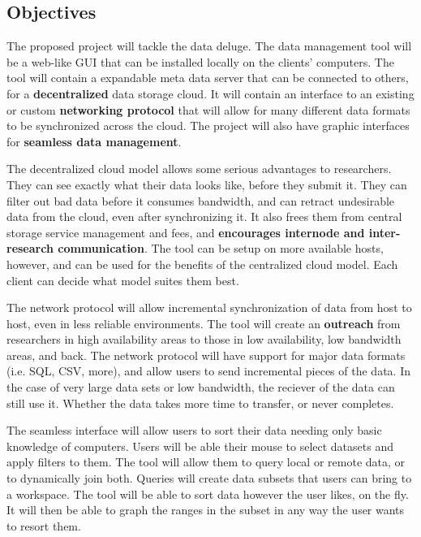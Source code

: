 \subsection{Objectives}
The proposed project will tackle the data deluge. The data management tool
will be a web-like GUI that can be installed locally on the clients' computers.
The tool will contain a expandable meta data server 
that can be connected to others, for a \textbf{decentralized} data storage
cloud. It will contain an interface to an existing or custom 
\textbf{networking protocol} that will allow for many different data formats
to be synchronized across the cloud. The project will also have graphic
interfaces for \textbf{seamless data management}.

The decentralized cloud model allows some serious advantages to researchers.
They can see exactly what their data looks like, before they submit it.
They can filter out bad data before it consumes bandwidth, and can retract
undesirable data from the cloud, even after synchronizing it. It also frees
them from central storage service management and fees, and 
\textbf{encourages internode and inter-research communication}. 
The tool can be setup
on more available hosts, however, and can be used for the benefits of 
the centralized cloud model. Each client can decide what model suites them 
best.

The network protocol will allow incremental synchronization of data from host
to host, even in less reliable environments. The tool will create
an \textbf{outreach} from researchers in high availability areas to those
in low availability, low bandwidth areas, and back. The network protocol
will have support for major data formats (i.e. SQL, CSV, more), and allow
users to send incremental pieces of the data. In the case of very large 
data sets or low bandwidth, the reciever of the data can still use it. Whether 
the data takes more time to transfer, or never completes.

The seamless interface will allow users to sort their data needing only 
basic knowledge of computers. Users will be able their mouse to select
datasets and apply filters to them. The tool will allow them to query local or
remote data, or to dynamically join both. Queries will create data subsets that
users can bring to a workspace. The tool will be able to sort data however
the user likes, on the fly. It will then be able to graph the ranges in 
the subset in any way the user wants to resort them.

